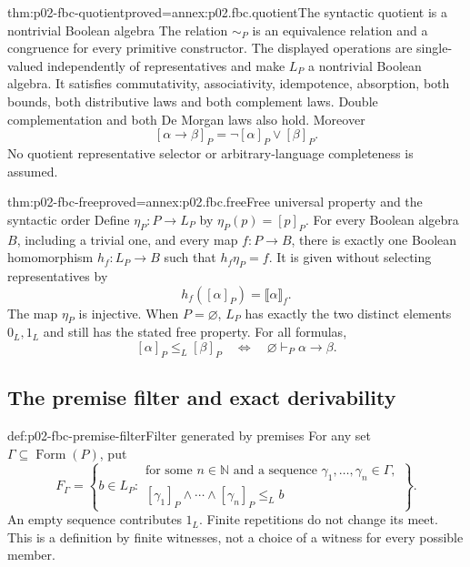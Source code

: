 \begin{hbtheorem}{thm:p02-fbc-quotient}{proved=annex:p02.fbc.quotient}{The syntactic quotient is a nontrivial Boolean algebra}
The relation \(\sim_P\) is an equivalence relation and a congruence
for every primitive constructor. The displayed operations are
single-valued independently of representatives and make \(L_P\)
a nontrivial Boolean algebra.
It satisfies commutativity, associativity, idempotence, absorption,
both bounds, both distributive laws and both complement laws.
Double complementation and both De Morgan laws also hold.
Moreover
\[
 [\alpha\to\beta]_P=\neg[\alpha]_P\vee[\beta]_P .
\]
No quotient representative selector or arbitrary-language completeness
is assumed.
\end{hbtheorem}

\begin{hbtheorem}{thm:p02-fbc-free}{proved=annex:p02.fbc.free}{Free universal property and the syntactic order}
Define \(\eta_P:P\to L_P\) by \(\eta_P(p)=[p]_P\).
For every Boolean algebra \(B\), including a trivial one, and every
map \(f:P\to B\), there is exactly one Boolean homomorphism
\(h_f:L_P\to B\) such that \(h_f\eta_P=f\).
It is given without selecting representatives by
\[
 h_f([\alpha]_P)=\llbracket\alpha\rrbracket_f .
\]
The map \(\eta_P\) is injective. When \(P=\varnothing\), \(L_P\)
has exactly the two distinct elements \(0_L,1_L\) and still has
the stated free property.
For all formulas,
\[
 [\alpha]_P\leq_L[\beta]_P
       \quad\Longleftrightarrow\quad
 \varnothing\vdash_P\alpha\to\beta .
\]
\end{hbtheorem}

\subsection{The premise filter and exact derivability}
\label{sec:p02-fbc-premise-filter}

\begin{hbdefinition}{def:p02-fbc-premise-filter}{Filter generated by premises}
For any set \(\Gamma\subseteq\operatorname{Form}(P)\), put
\[
 F_\Gamma=
 \left\{b\in L_P:
 \begin{array}{l}
 \text{for some }n\in\mathbb N\text{ and a sequence }
       \gamma_1,\ldots,\gamma_n\in\Gamma,\\
 {}[\gamma_1]_P\wedge\cdots\wedge[\gamma_n]_P\leq_L b
 \end{array}\right\}.
\]
An empty sequence contributes \(1_L\). Finite repetitions do not
change its meet. This is a definition by finite witnesses, not a
choice of a witness for every possible member.
\end{hbdefinition}

